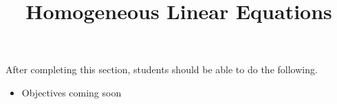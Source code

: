 \documentclass{ximera}
\title{Homogeneous Linear Equations}
\begin{document}
\begin{abstract}
\end{abstract}

\maketitle

\begin{sectionOutcomes}

After completing this section, students should be able to do the following.

\begin{itemize}
	\item Objectives coming soon
\end{itemize}

\end{sectionOutcomes}
\end{document}
